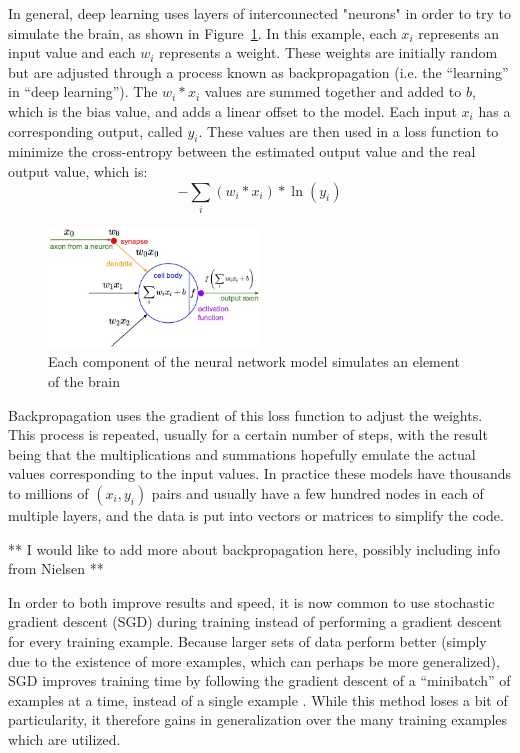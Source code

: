 \documentclass[]{report}
\begin{document}
In general, deep learning uses layers of interconnected "neurons" in order to try to simulate the brain, as shown in Figure~\ref{neural-model}. In this example, each $x_{i}$ represents an input value and each $w_{i}$ represents a weight. These weights are initially random but are adjusted through a process known as backpropagation (i.e. the ``learning'' in ``deep learning''). The $w_{i}*x_{i}$ values are summed together and added to $b$, which is the bias value, and adds a linear offset to the model. Each input $x_{i}$ has a corresponding output, called $y_{i}$. These values are then used in a loss function to minimize the cross-entropy between the estimated output value and the real output value, which is: $$-\sum_{i} (w_{i}*x_{i})*\ln(y_{i}) $$
\begin{figure}
	\centering
	\includegraphics[width=0.5\textwidth]{../images/neuron_model}
	\caption{Each component of the neural network model simulates an element of the brain \cite{karpathy}}
	\label{neural-model}
\end{figure}

Backpropagation uses the gradient of this loss function to adjust the weights. This process is repeated, usually for a certain number of steps, with the result being that the multiplications and summations hopefully emulate the actual values corresponding to the input values. In practice these models have thousands to millions of $(x_{i}, y_{i})$ pairs and usually have a few hundred nodes in each of multiple layers, and the data is put into vectors or matrices to simplify the code. 

** I would like to add more about backpropagation here, possibly including info from Nielsen **


In order to both improve results and speed, it is now common to use stochastic gradient descent (SGD) during training instead of performing a gradient descent for every training example. Because larger sets of data perform better (simply due to the existence of more examples, which can perhaps be more generalized), SGD improves training time by following the gradient descent of a ``minibatch'' of examples at a time, instead of a single example \cite{Goodfellow-et-al-2016,ThreeGiants}. While this method loses a bit of particularity, it therefore gains in generalization over the many training examples which are utilized.
\end{document}
